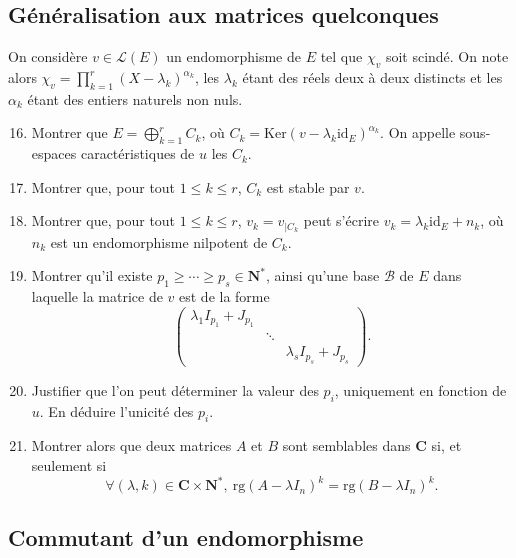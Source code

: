 \documentclass[a4paper,11pt]{article}
\newcommand{\N}{\mathbf{N}}
\newcommand{\C}{\mathbf{C}}
\renewcommand{\L}{\mathcal{L}}
\begin{document}
	\subsection{Généralisation aux matrices quelconques}
	On considère $v\in\L(E)$ un endomorphisme de $E$ tel que $\chi_v$ soit scindé. On note alors $\chi_v=\displaystyle\prod_{k=1}^r(X-\lambda_k)^{\alpha_k}$, les $\lambda_k$ étant des réels deux à deux distincts et les $\alpha_k$ étant des entiers naturels non nuls.
	\begin{enumerate}
	\setcounter{enumi}{15}
	\item Montrer que $E=\displaystyle\bigoplus_{k=1}^rC_k$, où $C_k=\mathrm{Ker}\left(v-\lambda_k\mathrm{id}_E\right)^{\alpha_k}$. On appelle sous-espaces caractéristiques de $u$ les $C_k$.
	\item Montrer que, pour tout $1\leq k\leq r$, $C_k$ est stable par $v$.
	\item Montrer que, pour tout $1\leq k\leq r$, $v_k=v_{\vert C_k}$ peut s'écrire $v_k=\lambda_k\mathrm{id}_E+n_k$, où $n_k$ est un endomorphisme nilpotent de $C_k$.
	\item Montrer qu'il existe $p_1\geq\cdots\geq p_s\in\N^*$, ainsi qu'une base $\mathcal{B}$ de $E$ dans laquelle la matrice de $v$ est de la forme \[\begin{pmatrix}
	\lambda_1I_{p_1}+J_{p_1}&\\&\ddots&\\&&\lambda_sI_{p_s}+J_{p_s}
	\end{pmatrix}.\]
	\item Justifier que l'on peut déterminer la valeur des $p_i$, uniquement en fonction de $u$. En déduire l'unicité des $p_i$.
	\item Montrer alors que deux matrices $A$ et $B$ sont semblables dans $\C$ si, et seulement si 
	\[\forall (\lambda,k)\in\C\times\N^*,\ \mathrm{rg}(A-\lambda I_n)^k=\mathrm{rg}(B-\lambda I_n)^k.\]
	\end{enumerate}
	
	\subsection{Commutant d'un endomorphisme}
\end{document}

